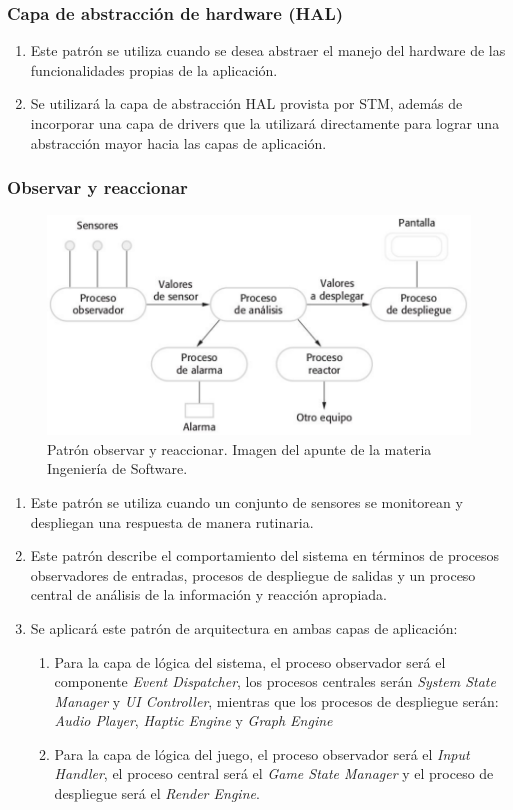 \documentclass[11pt,a4paper]{article}
\begin{document}
\subsubsection{Capa de abstracción de hardware (HAL)}
\begin{enumerate}
    \item Este patrón se utiliza cuando se desea abstraer el manejo del hardware de las funcionalidades propias de la aplicación.
    \item Se utilizará la capa de abstracción HAL provista por STM, además de incorporar una capa de drivers que la utilizará directamente para lograr una abstracción mayor hacia las capas de aplicación.
\end{enumerate}

\subsubsection{Observar y reaccionar}

\begin{figure}[htb]
\centering 
\includegraphics[width=.75\textwidth]{../Figuras/observarYreaccionar.png}
\caption{Patrón observar y reaccionar. Imagen del apunte de la materia Ingeniería de Software.}
\label{fig:obReaSYS}
\end{figure}

\begin{enumerate}
    \item Este patrón se utiliza cuando un conjunto de sensores se monitorean y despliegan una respuesta de manera rutinaria. 
    \item Este patrón describe el comportamiento del sistema en términos de procesos observadores de entradas, procesos de despliegue de salidas y un proceso central de análisis de la información y reacción apropiada. 
    \item Se aplicará este patrón de arquitectura en ambas capas de aplicación:
    \begin{enumerate}
    \item Para la capa de lógica del sistema, el proceso observador será el componente \textit{Event Dispatcher}, los procesos centrales serán \textit{System State Manager} y \textit{UI Controller}, mientras que los procesos de despliegue serán: \textit{Audio Player}, \textit{Haptic Engine} y \textit{Graph Engine}
    \item Para la capa de lógica del juego, el proceso observador será el \textit{Input Handler}, el proceso central será el \textit{Game State Manager} y el proceso de despliegue será el \textit{Render Engine}.
    \end{enumerate}
\end{enumerate}
\end{document}
